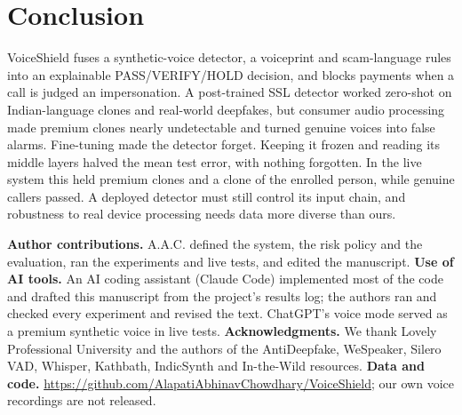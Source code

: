 \documentclass[10pt,a4paper,twocolumn]{article}
\begin{document}
\section{Conclusion}
VoiceShield fuses a synthetic-voice detector, a voiceprint and scam-language rules into an explainable PASS/VERIFY/HOLD decision, and blocks payments when a call is judged an impersonation. A post-trained SSL detector worked zero-shot on Indian-language clones and real-world deepfakes, but consumer audio processing made premium clones nearly undetectable and turned genuine voices into false alarms. Fine-tuning made the detector forget. Keeping it frozen and reading its middle layers halved the mean test error, with nothing forgotten. In the live system this held premium clones and a clone of the enrolled person, while genuine callers passed. A deployed detector must still control its input chain, and robustness to real device processing needs data more diverse than ours.

\smallskip
\noindent\textbf{Author contributions.} %
A.A.C. defined the system, the risk policy and the evaluation, ran the experiments and live tests, and edited the manuscript.
\textbf{Use of AI tools.} An AI coding assistant (Claude Code) implemented most of the code and drafted this manuscript from the project's results log; the authors ran and checked every experiment and revised the text. ChatGPT's voice mode served as a premium synthetic voice in live tests.
\textbf{Acknowledgments.} We thank Lovely Professional University and the authors of the AntiDeepfake, WeSpeaker, Silero VAD, Whisper, Kathbath, IndicSynth and In-the-Wild resources.
\textbf{Data and code.} \url{https://github.com/AlapatiAbhinavChowdhary/VoiceShield}; our own voice recordings are not released.
\end{document}
